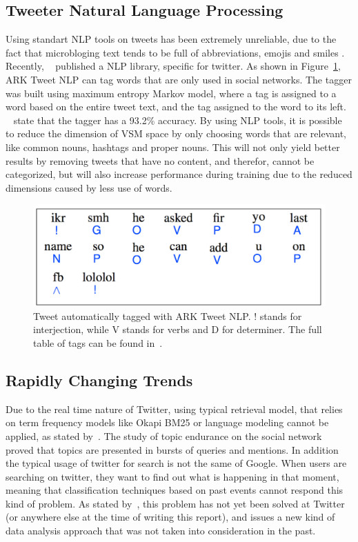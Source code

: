 \subsection{Tweeter Natural Language Processing}
\label{sub:tweeter_natural_language_processing}
Using standart \ac{NLP} tools on tweets has been extremely unreliable, due to the fact that microbloging text tends to be full of abbreviations, emojis and smiles . Recently, ~\citet{owoputi13improvedparth} published a \ac{NLP} library, specific for twitter. As shown in Figure~\ref{fig:nlp}, ARK Tweet \ac{NLP} can tag words that are only used in social networks. The tagger was built using maximum entropy Markov model, where a tag is assigned to a word based on the entire tweet text, and the tag assigned to the word to its left. ~\citet{owoputi13improvedparth} state that the tagger has a 93.2\% accuracy. 
By using \ac{NLP} tools, it is possible to reduce the dimension of \ac{VSM} space by only choosing words that are relevant, like common nouns, hashtags and proper nouns. This will not only yield better results by removing tweets that have no content, and therefor, cannot be categorized, but will also increase performance during training due to the reduced dimensions caused by less use of words.
\begin{figure}[htpb]
  \centering
  \includegraphics[width=0.6\linewidth]{./images/nlp.pdf}
  \caption{Tweet automatically tagged with ARK Tweet NLP. ! stands for interjection, while V stands for verbs and D for determiner. The full table of tags can be found in~\cite{owoputi13improvedparth}.}
  \label{fig:nlp}
\end{figure}

\subsection{Rapidly Changing Trends} 
\label{sub:real_time_}
Due to the real time nature of Twitter, using typical retrieval model, that relies on term frequency models like Okapi BM25 or language modeling cannot be applied, as stated by~\citet{Lin2012}. The study of topic endurance on the social network proved that topics are presented in bursts of queries and mentions. In addition the typical usage of twitter for search is not the same of Google. When users are searching on twitter, they want to find out what is happening in that moment, meaning that classification techniques based on past events cannot respond this kind of problem. As stated by~\citet{Lin2012}, this problem has not yet been solved at Twitter (or anywhere else at the time of writing this report), and issues a new kind of data analysis approach that was not taken into consideration in the past. 


